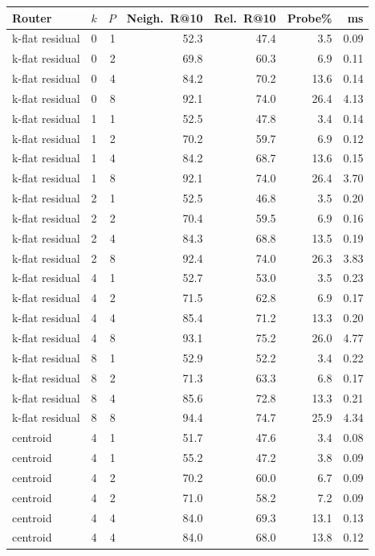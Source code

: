 \begin{tabular}{llrrrrr}
\toprule
Router & $k$ & $P$ & Neigh.\ R@10 & Rel.\ R@10 & Probe\% & ms \\
\midrule
k-flat residual & 0 & 1 & 52.3 & 47.4 & 3.5 & 0.09 \\
k-flat residual & 0 & 2 & 69.8 & 60.3 & 6.9 & 0.11 \\
k-flat residual & 0 & 4 & 84.2 & 70.2 & 13.6 & 0.14 \\
k-flat residual & 0 & 8 & 92.1 & 74.0 & 26.4 & 4.13 \\
k-flat residual & 1 & 1 & 52.5 & 47.8 & 3.4 & 0.14 \\
k-flat residual & 1 & 2 & 70.2 & 59.7 & 6.9 & 0.12 \\
k-flat residual & 1 & 4 & 84.2 & 68.7 & 13.6 & 0.15 \\
k-flat residual & 1 & 8 & 92.1 & 74.0 & 26.4 & 3.70 \\
k-flat residual & 2 & 1 & 52.5 & 46.8 & 3.5 & 0.20 \\
k-flat residual & 2 & 2 & 70.4 & 59.5 & 6.9 & 0.16 \\
k-flat residual & 2 & 4 & 84.3 & 68.8 & 13.5 & 0.19 \\
k-flat residual & 2 & 8 & 92.4 & 74.0 & 26.3 & 3.83 \\
k-flat residual & 4 & 1 & 52.7 & 53.0 & 3.5 & 0.23 \\
k-flat residual & 4 & 2 & 71.5 & 62.8 & 6.9 & 0.17 \\
k-flat residual & 4 & 4 & 85.4 & 71.2 & 13.3 & 0.20 \\
k-flat residual & 4 & 8 & 93.1 & 75.2 & 26.0 & 4.77 \\
k-flat residual & 8 & 1 & 52.9 & 52.2 & 3.4 & 0.22 \\
k-flat residual & 8 & 2 & 71.3 & 63.3 & 6.8 & 0.17 \\
k-flat residual & 8 & 4 & 85.6 & 72.8 & 13.3 & 0.21 \\
k-flat residual & 8 & 8 & 94.4 & 74.7 & 25.9 & 4.34 \\
centroid & 4 & 1 & 51.7 & 47.6 & 3.4 & 0.08 \\
centroid & 4 & 1 & 55.2 & 47.2 & 3.8 & 0.09 \\
centroid & 4 & 2 & 70.2 & 60.0 & 6.7 & 0.09 \\
centroid & 4 & 2 & 71.0 & 58.2 & 7.2 & 0.09 \\
centroid & 4 & 4 & 84.0 & 69.3 & 13.1 & 0.13 \\
centroid & 4 & 4 & 84.0 & 68.0 & 13.8 & 0.12 \\

\end{tabular}
